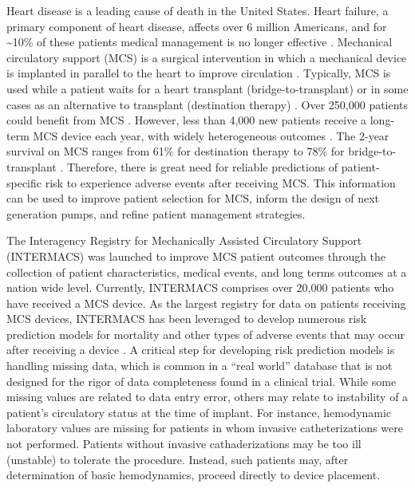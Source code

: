 \documentclass{article}
\begin{document}
\linenumbers
\doublespacing

Heart disease is a leading cause of death in the United States. Heart
failure, a primary component of heart disease, affects over 6 million
Americans, and for \textasciitilde10\% of these patients medical
management is no longer effective
\cite{benjamin2017heart,national2017health}. Mechanical circulatory
support (MCS) is a surgical intervention in which a mechanical device is
implanted in parallel to the heart to improve circulation
\cite{patel2014contemporary}. Typically, MCS is used while a patient
waits for a heart transplant (bridge-to-transplant) or in some cases as
an alternative to transplant (destination therapy)
\cite{slaughter2009advanced}. Over 250,000 patients could benefit from
MCS \cite{miller2011left}. However, less than 4,000 new patients receive
a long-term MCS device each year, with widely heterogeneous outcomes
\cite{stewart2011keeping}. The 2-year survival on MCS ranges from 61\%
for destination therapy to 78\% for bridge-to-transplant
\cite{patel2014contemporary}. Therefore, there is great need for
reliable predictions of patient-specific risk to experience adverse
events after receiving MCS. This information can be used to improve
patient selection for MCS, inform the design of next generation pumps,
and refine patient management strategies.

The Interagency Registry for Mechanically Assisted Circulatory Support
(INTERMACS) was launched to improve MCS patient outcomes through the
collection of patient characteristics, medical events, and long terms
outcomes at a nation wide level. Currently, INTERMACS comprises over
20,000 patients who have received a MCS device. As the largest registry
for data on patients receiving MCS devices, INTERMACS has been leveraged
to develop numerous risk prediction models for mortality and other types
of adverse events that may occur after receiving a device
\cite{kirklin2017eighth, kormos2019society, Adamo950}. A critical step
for developing risk prediction models is handling missing data, which is
common in a ``real world'' database that is not designed for the rigor
of data completeness found in a clinical trial. While some missing
values are related to data entry error, others may relate to instability
of a patient's circulatory status at the time of implant. For instance,
hemodynamic laboratory values are missing for patients in whom invasive
catheterizations were not performed. Patients without invasive
cathaderizations may be too ill (unstable) to tolerate the procedure.
Instead, such patients may, after determination of basic hemodynamics,
proceed directly to device placement.
\end{document}
